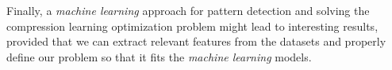 Finally, a \textit{machine learning} approach for pattern detection and solving the compression learning optimization problem might lead to interesting results, provided that we can extract relevant features from the datasets and properly define our problem so that it fits the \textit{machine learning} models.

\iffalse

*** pbib ***

*** pd & learning ***


*** other ***
\fi

